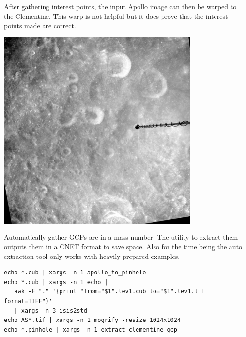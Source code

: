 \documentclass[12pt]{article}
\begin{document}
After gathering interest points, the input Apollo image can then be
warped to the Clementine. This warp is not helpful but it does prove
that the interest points made are correct.

\includegraphics[width=4in]{images/aligned_AS16-M-1192.jpg}

Automatically gather GCPs are in a mass number. The utility to extract
them outputs them in a CNET format to save space. Also for the time
being the auto extraction tool only works with heavily prepared
examples.

\begin{verbatim}
echo *.cub | xargs -n 1 apollo_to_pinhole
echo *.cub | xargs -n 1 echo |
   awk -F "." '{print "from="$1".lev1.cub to="$1".lev1.tif format=TIFF"}'
   | xargs -n 3 isis2std
echo AS*.tif | xargs -n 1 mogrify -resize 1024x1024
echo *.pinhole | xargs -n 1 extract_clementine_gcp
\end{verbatim}
\end{document}
